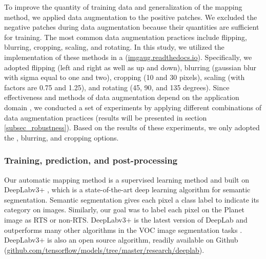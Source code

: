 \documentclass[authoryear,preprint,review,12pt]{elsarticle}
\begin{document}
To improve the quantity of training data and generalization of the mapping method, we applied data augmentation to the positive patches.  We excluded the negative patches during data augmentation because their quantities are sufficient for training. The most common data augmentation practices include flipping, blurring, cropping, scaling, and rotating. In this study, we utilized the implementation of these methods in a  (\url{imgaug.readthedocs.io}). Specifically, we adopted flipping (left and right as well as up and down), blurring (gaussian blur with sigma equal to one and two), cropping (10 and 30 pixels), scaling (with factors are 0.75 and 1.25), and rotating (45, 90, and 135 degrees). Since effectiveness and methods of data augmentation depend on the application domain \citep{perez2017effectiveness}, we conducted a set of experiments by applying different combinations of data augmentation practices (results will be presented in section \ref{subsec_robustness}). Based on the results of these experiments, we only adopted the , blurring, and cropping options. 

\subsubsection{Training, prediction, and post-processing}
\label{subsubsec_deeplab}

Our automatic mapping method is a supervised learning method and built on DeepLabv3+ \citep{chen_encoder-decoder_2018}, which is a state-of-the-art deep learning algorithm for semantic segmentation. Semantic segmentation gives each pixel a class label to indicate its category on images. Similarly, our goal was to label each pixel on the Planet image as RTS or non-RTS. DeepLabv3+ is the latest version of DeepLab and outperforms  many other algorithms in the  VOC image segmentation tasks \citep{everingham_pascal_2015}. DeepLabv3+ is also an open source algorithm, readily available on Github (\url{github.com/tensorflow/models/tree/master/research/deeplab}).
\end{document}
